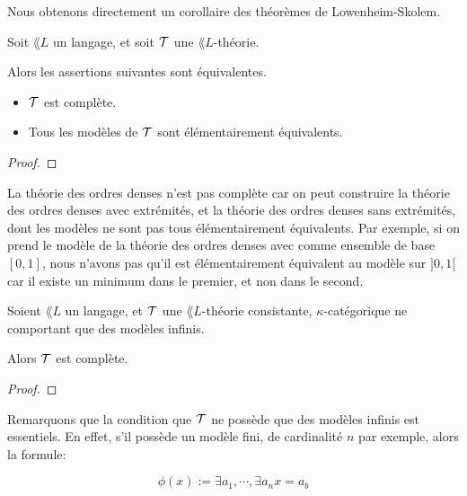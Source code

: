 \documentclass[a4paper, 12pt]{article}
\begin{document}
Nous obtenons directement un corollaire des théorèmes de Lowenheim-Skolem.

\begin{corollary}
	\label{lemma:complete_equiv_elementaire_equivalentes}
	Soit $\lang{L}$ un langage, et soit $\mathcal{T}$ une $\lang{L}$-théorie.

	Alors les assertions suivantes sont équivalentes.

	\begin{itemize}
		\item $\mathcal{T}$ est complète.
		\item Tous les modèles de $\mathcal{T}$ sont élémentairement équivalents.
	\end{itemize}
\end{corollary}

\begin{proof}

\end{proof}

\begin{exemple}
	La théorie des ordres denses n'est pas complète car on peut construire la
	théorie des ordres denses avec extrémités, et la théorie des ordres denses
	sans extrémités, dont les modèles ne sont pas tous élémentairement
	équivalents. Par exemple, si on prend le modèle de la théorie des ordres
	denses avec comme ensemble de base $[0, 1]$, nous n'avons pas qu'il est
	élémentairement équivalent au modèle sur $]0, 1[$ car il existe un minimum dans
	le premier, et non dans le second.
\end{exemple}

\begin{theorem} 
	\label{theorem:vaught}
	Soient $\lang{L}$ un langage, et $\mathcal{T}$ une $\lang{L}$-théorie
	consistante, $\kappa$-catégorique ne
	comportant que des modèles infinis.

	Alors $\mathcal{T}$ est complète.
\end{theorem}

\begin{proof}

\end{proof}

Remarquons que la condition que $\mathcal{T}$ ne possède que des modèles infinis
est essentiels. En effet, s'il possède un modèle fini, de cardinalité $n$ par exemple, alors la formule:

\begin{equation}
	\phi(x) := \exists a_{1}, \cdots, \exists a_{n} x = a_{b}
\end{equation}
\end{document}
